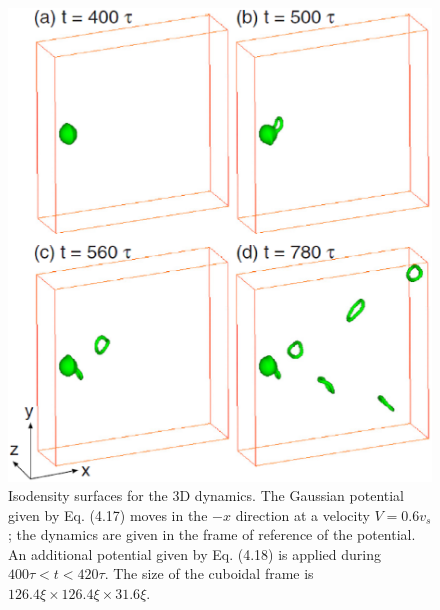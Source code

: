 \documentclass[12pt,a4paper]{report} %
\begin{document}
\begin{figure}[htbp]
\begin{center}
\includegraphics[scale=0.55, keepaspectratio]{4-6.eps}
\caption{
Isodensity surfaces for the 3D dynamics.
The Gaussian potential given by Eq. (4.17) moves in the $-x$ direction
at a velocity $V=0.6v_s$; the dynamics are given in the frame of
reference of the potential. An additional potential given by Eq. (4.18)
is applied during $400 \tau < t < 420 \tau$. The size of the cuboidal frame
is $126.4 \xi \times 126.4 \xi \times 31.6 \xi$.
}
\label{FIG:4-6}
\end{center}
\end{figure}
\end{document}
